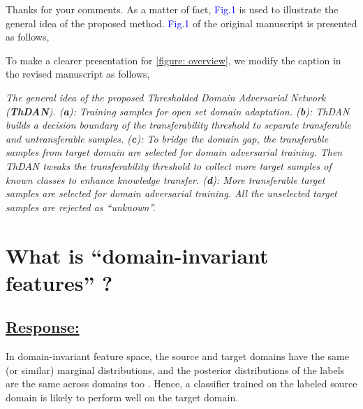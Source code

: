 Thanks for your comments.
As a matter of fact, \textcolor{blue}{Fig.1} is used to illustrate the general idea of the proposed method.
\textcolor{blue}{Fig.1} of the original manuscript is presented as follows,

To make a clearer presentation for \figurename{\ref{figure: overview}}, we modify the caption in the revised manuscript as follows,
\begin{siderules}
    \textit{
        \footnotesize
        The general idea of the proposed Thresholded Domain Adversarial Network (\textit{\textbf{ThDAN}}).
        (\textbf{a}): Training samples for open set domain adaptation.
        (\textbf{b}): ThDAN builds a decision boundary of the transferability threshold to separate transferable and untransferable samples. 
        (\textbf{c}): To bridge the domain gap, the transferable samples from target domain are selected for domain adversarial training.
        Then ThDAN tweaks the transferability threshold to collect more target samples of known classes to enhance knowledge transfer.
        (\textbf{d}): More transferable target samples are selected for domain adversarial training. All the unselected target samples are rejected as ``unknown''.
    }
\end{siderules}


\section{What is ``domain-invariant features'' ?}
\subsection*{\underline{\textbf{Response:}}}

In domain-invariant feature space, the source and target domains have the same (or similar) marginal distributions, and the posterior distributions of the labels are the same across domains too \cite{DeepDomainConfusion}.
Hence, a classifier trained on the labeled source domain is likely to perform well on the target domain.

